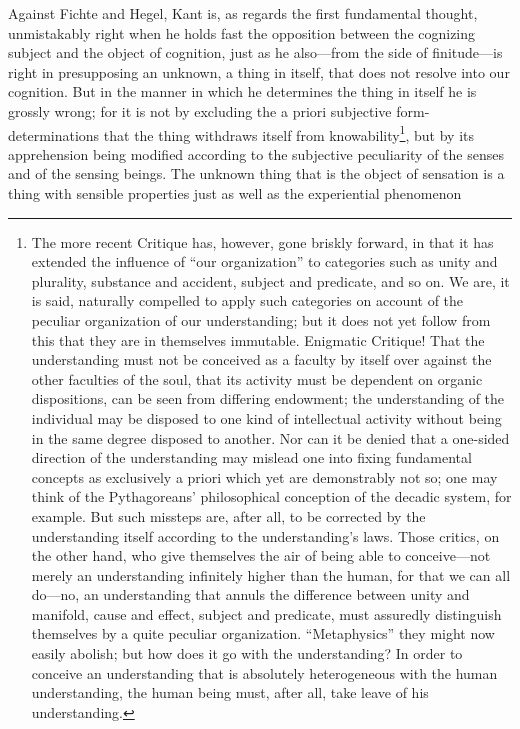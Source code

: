 \documentclass[12pt]{article}
\begin{document}
Against Fichte and Hegel, Kant is, as regards the first fundamental
thought, unmistakably right when he holds fast the opposition between the
cognizing subject and the object of cognition, just as he also—from the
side of finitude—is right in presupposing an unknown, a thing in itself,
that does not resolve into our cognition. But in the manner in which he
determines the thing in itself he is grossly wrong; for it is not by
excluding the a priori subjective form-determinations that the thing
withdraws itself from knowability\footnote{The more recent Critique has,
however, gone briskly forward, in that it has extended the influence of
``our organization'' to categories such as unity and plurality, substance
and accident, subject and predicate, and so on. We are, it is said,
naturally compelled to apply such categories on account of the peculiar
organization of our understanding; but it does not yet follow from this
that they are in themselves immutable. Enigmatic Critique! That the
understanding must not be conceived as a faculty by itself over against the
other faculties of the soul, that its activity must be dependent on organic
dispositions, can be seen from differing endowment; the understanding of
the individual may be disposed to one kind of intellectual activity without
being in the same degree disposed to another. Nor can it be denied that a
one-sided direction of the understanding may mislead one into fixing
fundamental concepts as exclusively a priori which yet are demonstrably not
so; one may think of the Pythagoreans' philosophical conception of the
decadic system, for example. But such missteps are, after all, to be
corrected by the understanding itself according to the understanding's
laws. Those critics, on the other hand, who give themselves the air of
being able to conceive—not merely an understanding infinitely higher than
the human, for that we can all do—no, an understanding that annuls the
difference between unity and manifold, cause and effect, subject and
predicate, must assuredly distinguish themselves by a quite peculiar
organization. ``Metaphysics'' they might now easily abolish; but how does
it go with the understanding? In order to conceive an understanding that is
absolutely heterogeneous with the human understanding, the human being
must, after all, take leave of his understanding.}, but by its apprehension
being modified according to the subjective peculiarity of the senses and of
the sensing beings. The unknown thing that is the object of sensation is a
thing with sensible properties just as well as the experiential phenomenon
\end{document}
